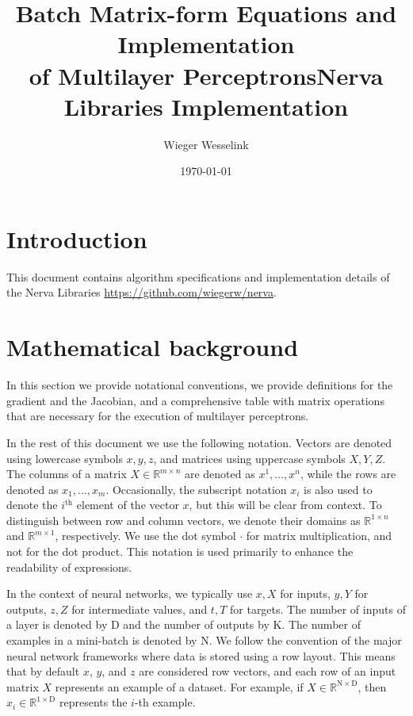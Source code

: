 \documentclass{article}
\newcommand{\const}[1]{\ensuremath{\mathrm{#1}}} %
\newcommand{\Reals}{\mathbb{R}}
\begin{document}
\title{\centering Batch Matrix-form Equations and Implementation \\ of Multilayer Perceptrons}

\title{Nerva Libraries Implementation}
\author{Wieger Wesselink}
\date{\today}

\maketitle

\tableofcontents

\section{Introduction}
This document contains algorithm specifications and implementation details of the Nerva Libraries \url{https://github.com/wiegerw/nerva}.

\section{Mathematical background} \label{section:mathematical-background}
In this section we provide notational conventions, we provide definitions for the gradient and the Jacobian, and a comprehensive table with matrix operations that are necessary for the execution of multilayer perceptrons.

In the rest of this document we use the following notation. Vectors are denoted using lowercase symbols $x, y, z$, and matrices using uppercase symbols $X, Y, Z$. The columns of a matrix $X \in \Reals^{m \times n}$ are denoted as $x^1, \ldots, x^n$, while the rows are denoted as $x_1, \ldots, x_m$. Occasionally, the subscript notation $x_i$ is also used to denote the $i^\text{th}$ element of the vector $x$, but this will be clear from context.
To distinguish between row and column vectors, we denote their domains as $\Reals^{1 \times n}$ and $\Reals^{m \times 1}$, respectively. We use the dot symbol $\cdot$ for matrix multiplication, and not for the dot product. This notation is used primarily to enhance the readability of expressions.

In the context of neural networks, we typically use $x, X$ for inputs, $y, Y$ for outputs, $z, Z$ for intermediate values, and $t, T$ for targets. The number of inputs of a layer is denoted by $\const{D}$ and the number of outputs by $\const{K}$. The number of examples in a mini-batch is denoted by $\const{N}$.
We follow the convention of the major neural network frameworks where data is stored using a row layout. This means that by default $x$, $y$, and $z$ are considered row vectors, and each row of an input matrix $X$ represents an example of a dataset. For example, if $X \in \Reals^{\const{N} \times \const{D}}$, then $x_i \in \Reals^{1 \times \const{D}}$ represents the $i$-th example.
\end{document}
